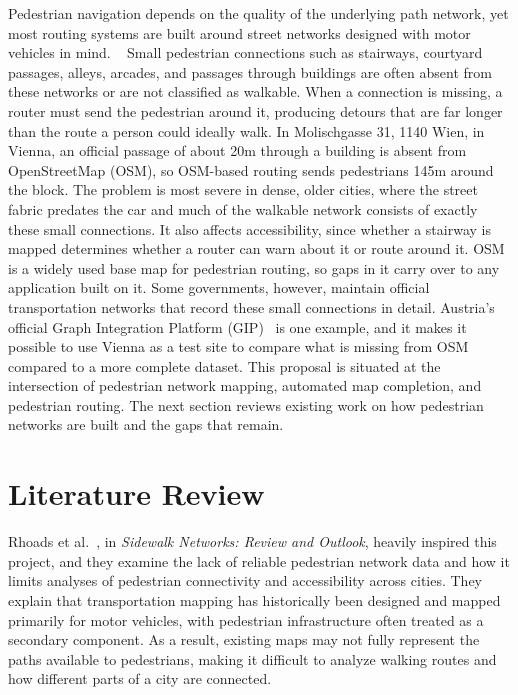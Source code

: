 \documentclass[conference]{IEEEtran}
\begin{document}
Pedestrian navigation depends on the quality of the underlying path network, yet most routing systems are built around street networks designed with motor vehicles in mind. ~\cite{rhoads2023} Small pedestrian connections such as stairways, courtyard passages, alleys, arcades, and passages through buildings are often absent from these networks or are not classified as walkable. When a connection is missing, a router must send the pedestrian around it, producing detours that are far longer than the route a person could ideally walk. In Molischgasse 31, 1140 Wien, in Vienna, an official passage of about 20m through a building is absent from OpenStreetMap (OSM), so OSM-based routing sends pedestrians 145m around the block. The problem is most severe in dense, older cities, where the street fabric predates the car and much of the walkable network consists of exactly these small connections. It also affects accessibility, since whether a stairway is mapped determines whether a router can warn about it or route around it. OSM is a widely used base map for pedestrian routing, so gaps in it carry over to any application built on it. Some governments, however, maintain official transportation networks that record these small connections in detail. Austria's official Graph Integration Platform (GIP)~\cite{gipdocs} is one example, and it makes it possible to use Vienna as a test site to compare what is missing from OSM compared to a more complete dataset. This proposal is situated at the intersection of pedestrian network mapping, automated map completion, and pedestrian routing. The next section reviews existing work on how pedestrian networks are built and the gaps that remain.


\section{Literature Review}

Rhoads et al.~\cite{rhoads2023}, in \emph{Sidewalk Networks: Review and Outlook}, heavily inspired this project, and they examine the lack of reliable pedestrian network data and how it limits analyses of pedestrian connectivity and accessibility across cities. They explain that transportation mapping has historically been designed and mapped primarily for motor vehicles, with pedestrian infrastructure often treated as a secondary component. As a result, existing maps may not fully represent the paths available to pedestrians, making it difficult to analyze walking routes and how different parts of a city are connected.
\end{document}

